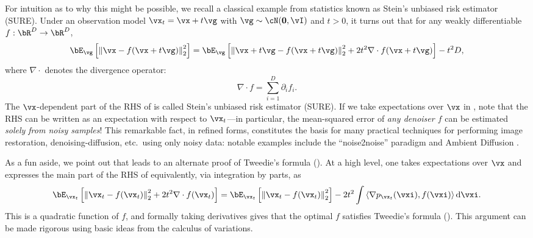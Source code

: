 \documentclass[../../book-main.tex]{subfiles}
\begin{document}
For intuition as to why this might be possible, we recall a classical example
from statistics known as Stein's unbiased risk estimator (SURE).
Under an observation model $\vx_t = \vx + t \vg$ with $\vg \sim \cN(\Zero,
\vI)$ and $t>0$, it turns out that for any weakly differentiable $f : \bR^D \to \bR^D$,
\begin{equation}\label{eq:sure-risk}
  \bE_{\vg}\left[
    \norm*{\vx - f(\vx + t \vg)}_2^2
    \right]
  =
  \bE_{\vg}\left[
    \norm*{\vx+t\vg - f(\vx + t \vg)}_2^2
    + 2t^2 \nabla \cdot f(\vx + t\vg)
    \right]
  - t^2 D,
\end{equation}
where $\nabla \cdot$ denotes the divergence operator:
\begin{equation*}
	\nabla \cdot f = \sum_{i=1}^D \partial_i f_i.
\end{equation*}
The $\vx$-dependent part of the RHS of  is called Stein's unbiased risk
estimator (SURE). If we take expectations over $\vx$ in ,
note that the RHS can be written as an expectation with respect to $\vx_t$---in
particular, the mean-squared error of \textit{any denoiser $f$} can be estimated
\textit{solely from noisy samples}!
This remarkable fact, in refined forms, constitutes the basis for many practical
techniques for performing image restoration, denoising-diffusion, etc.\ using
only noisy data: notable examples include the ``noise2noise'' paradigm
\cite{pmlr-v80-lehtinen18a}
and Ambient Diffusion \cite{daras2023ambient}.

As a fun aside, we point out that  leads to an alternate
proof of Tweedie's formula (). At a high level, one takes
expectations over $\vx$ and expresses the main part of the RHS of
 equivalently, via integration by parts, as
\begin{equation}
  \bE_{\vx_t}\left[
    \norm*{\vx_t - f(\vx_t)}_2^2
    + 2t^2 \nabla \cdot f(\vx_t)
    \right]
  =
  \bE_{\vx_t}\left[
    \norm*{\vx_t - f(\vx_t)}_2^2
    \right]
  - 2t^2 \int
  \ip*{\nabla p_{\vx_t}(\vxi)}{f(\vxi)}
  \odif \vxi.
\end{equation}
This is a quadratic function of $f$, and formally taking derivatives gives
that the optimal $f$ satisfies Tweedie's formula (). This
argument can be made rigorous using basic ideas from the calculus of variations.
\end{document}
